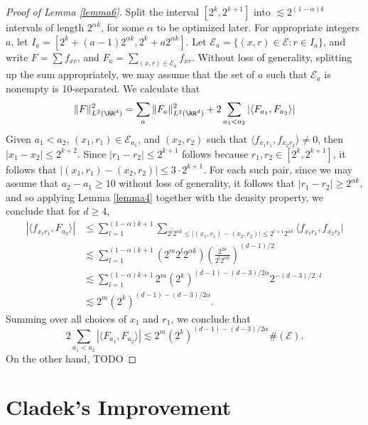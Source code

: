 \begin{proof}[Proof of Lemma \ref{lemma6}]
    Split the interval $[2^k,2^{k+1}]$ into $\lesssim 2^{(1 - \alpha)k}$ intervals of length $2^{\alpha k}$, for some $\alpha$ to be optimized later. For appropriate integers $a$, let $I_a = [2^k + (a-1) 2^{\alpha k}, 2^k + a 2^{\alpha k}]$. Let $\mathcal{E}_a = \{ (x,r) \in \mathcal{E}: r \in I_a \}$, and write $F = \sum f_{xr}$, and $F_a = \sum_{(x,r) \in \mathcal{E}_a} f_{xr}$. Without loss of generality, splitting up the sum appropriately, we may assume that the set of $a$ such that $\mathcal{E}_a$ is nonempty is 10-separated. We calculate that
    \[ \| F \|_{L^2(\RR^d)}^2 = \sum_a \| F_a \|_{L^2(\RR^d)}^2 + 2 \sum_{a_1 < a_2} |\langle F_{a_1}, F_{a_2} \rangle| \]
    Given $a_1 < a_2$, $(x_1,r_1) \in \mathcal{E}_{a_1}$, and $(x_2,r_2)$ such that $\langle f_{x_1r_1}, f_{x_2r_2} \rangle \neq 0$, then $|x_1 - x_2| \leq 2^{k+2}$. Since $|r_1 - r_2| \leq 2^{k+1}$ follows because $r_1,r_2 \in [2^k,2^{k+1}]$, it follows that $|(x_1,r_1) - (x_2,r_2)| \leq 3 \cdot 2^{k+1}$. For each such pair, since we may assume that $a_2 - a_1 \geq 10$ without loss of generality, it follows that $|r_1 - r_2| \geq 2^{\alpha k}$, and so applying Lemma \ref{lemma4} together with the density property, we conclude that for $d \geq 4$,
    \begin{align*}
        |\langle f_{x_1r_1}, F_{a_2} \rangle| &\leq \sum_{l = 1}^{(1 - \alpha)k + 1} \sum_{2^l 2^{\alpha k} \leq |(x_1,r_1) - (x_2,r_2)| \leq 2^{l+1} 2^{\alpha k}} \langle f_{x_1r_1}, f_{x_2r_2}|\\
        &\lesssim \sum_{l = 1}^{(1 - \alpha)k + 1} (2^m 2^l 2^{\alpha k}) \left( \frac{2^{2k}}{2^l 2^{\alpha k}} \right)^{(d-1)/2}\\
        &\lesssim \sum_{l = 1}^{(1 - \alpha)k + 1} 2^m (2^k)^{ (d-1) - (d-3)/2 \alpha } 2^{-(d-3)/2 \cdot l}\\
        &\lesssim 2^m (2^k)^{(d-1) - (d-3)/2 \alpha}.
    \end{align*}
    Summing over all choices of $x_1$ and $r_1$, we conclude that
    \[ 2 \sum_{a_1 < a_2} |\langle F_{a_1}, F_{a_2} \rangle| \lesssim 2^m (2^k)^{(d-1) - (d-3)/2 \alpha} \#(\mathcal{E}). \]
    On the other hand, TODO
\end{proof}

\section{Cladek's Improvement}




